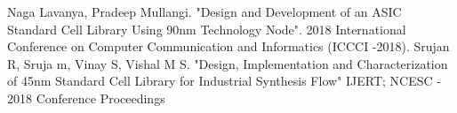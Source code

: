 \documentclass[conference]{IEEEtran}
\begin{document}
\begin{thebibliography}{00}

  Naga Lavanya, Pradeep Mullangi. "Design and Development of an ASIC Standard Cell Library Using 90nm Technology Node". 2018 International Conference on Computer Communication and Informatics (ICCCI -2018).  
 Srujan R, Sruja m, Vinay S, Vishal M S. "Design, Implementation and Characterization of 45nm Standard Cell Library for Industrial Synthesis Flow" IJERT; NCESC - 2018 Conference Proceedings
\end{thebibliography}
\end{document}
